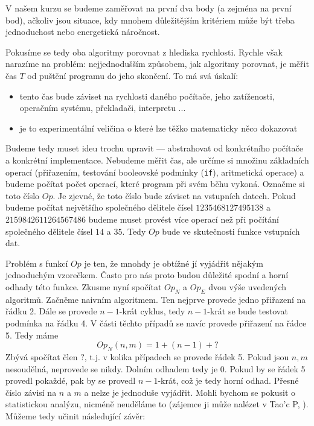 V našem kurzu se budeme zaměřovat na první dva body (a zejména na první bod), ačkoliv jsou situace, kdy mnohem důležitějším
kritériem může být třeba jednoduchost nebo energetická náročnost.  

Pokusíme se tedy oba algoritmy porovnat z hlediska rychlosti.  Rychle však narazíme na problém: nejjednodušším způsobem,
jak algoritmy porovnat, je měřit čas $T$ od puštění programu do jeho skončení. To má svá úskalí:

\begin{itemize}
 \item tento čas bude záviset na rychlosti daného počítače, jeho zatíženosti, operačním systému, překladači, interpretu ...
 \item je to experimentální veličina o které lze těžko matematicky něco dokazovat
\end{itemize}

Budeme tedy muset ideu trochu upravit --- abstrahovat od konkrétního počítače a konkrétní implementace. Nebudeme měřit čas, 
ale určíme si množinu základních operací (přiřazením, testování booleovské podmínky ({\tt if}), aritmetická operace) a budeme počítat 
počet operací,  které program při svém běhu vykoná. Označme si toto číslo $Op$. Je zjevné, že 
toto číslo bude záviset na vstupních datech. Pokud budeme počítat největšího společného dělitele čísel
$1235468127495138$ a $2159842611264567486$ budeme muset provést více operací než při počítání společného dělitele čísel
$14$ a $35$. Tedy $Op$ bude ve skutečnosti funkce vstupních dat.

Problém s funkcí $Op$ je ten, že mnohdy je obtížné jí vyjádřit nějakým jednoduchým vzorečkem. Často pro nás proto budou
důležité spodní a horní odhady této funkce. Zkusme nyní spočítat $Op_N$ a $Op_E$ dvou výše uvedených algoritmů. Začněme
naivním algoritmem. Ten nejprve provede jedno přiřazení na řádku 2. Dále se provede $n-1$-krát cyklus, tedy $n-1$-krát
se bude testovat podmínka na řádku 4. V části těchto případů se navíc provede přiřazení na řádce 5. Tedy máme
\begin{displaymath}
 Op_N(n,m) = 1 + (n-1) + ?
\end{displaymath}
Zbývá spočítat člen $?$, t.j. v kolika případech se provede řádek 5. Pokud jsou $n,m$ nesoudělná, neprovede se nikdy.
Dolním odhadem tedy je $0$. Pokud by se řádek 5 provedl pokaždé, pak by se provedl $n-1$-krát, což je tedy horní odhad.
Přesné číslo závisí na $n$ a $m$ a nelze je jednoduše vyjádřit. Mohli bychom se pokusit o statistickou analýzu, nicméně
neuděláme to (zájemce ji může nalézet v Tao'c P, \cite{TAOCP2}). Můžeme tedy učinit následující závěr:

